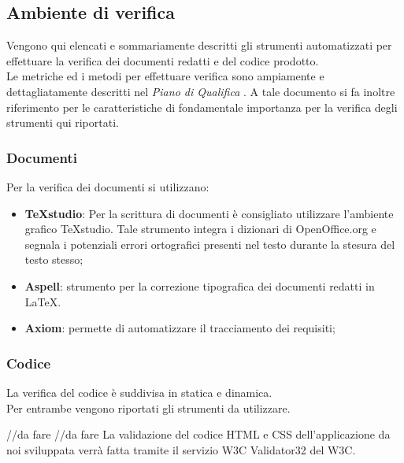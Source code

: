 \documentclass[a4paper,12pt]{article}
\newcounter{subsubsubsection}[subsubsection]
\begin{document}
{\subsection{Ambiente di verifica}
{ 
Vengono qui elencati e sommariamente descritti gli strumenti automatizzati per effettuare la verifica dei documenti redatti e del codice prodotto.\\ 
Le metriche ed i metodi per effettuare verifica sono ampiamente e dettagliatamente descritti nel \emph{Piano di Qualifica} . A tale documento si fa inoltre riferimento per le 
caratteristiche di fondamentale importanza per la verifica degli strumenti qui riportati. 
}
\subsubsection{Documenti}
{ 
Per la verifica dei documenti si utilizzano:
\begin{itemize}
\item \textbf{TeXstudio}: Per la scrittura di documenti è consigliato utilizzare l’ambiente grafico TeXstudio. Tale strumento integra i dizionari di OpenOffice.org e segnala i potenziali errori ortografici presenti nel 
testo durante la stesura del testo stesso; 
\item \textbf{Aspell}: strumento per la correzione tipografica dei documenti redatti in \LaTeX. 
\item \textbf{Axiom}: permette di automatizzare il tracciamento dei requisiti; 
\end{itemize} 
}
\subsubsection{Codice} 
{
La verifica del codice è suddivisa in statica e dinamica.\\ 
Per entrambe vengono riportati gli strumenti da utilizzare. 

{
//da fare
} 
{
//da fare
}
{
La validazione del codice HTML e CSS dell’applicazione da noi sviluppata verrà
fatta tramite il servizio W3C Validator32 del W3C.
}
}
}
\end{document}
